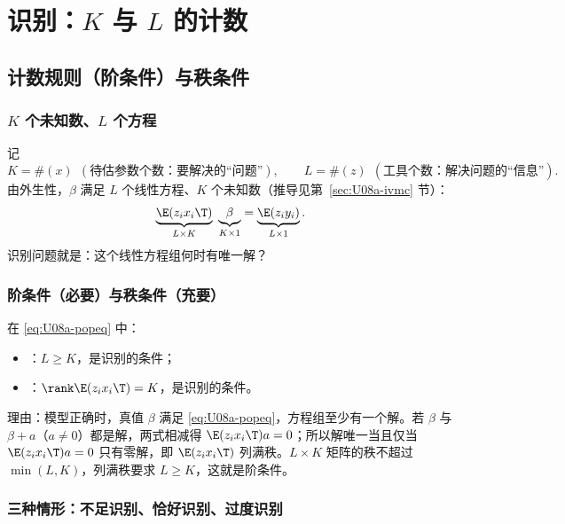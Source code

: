 \section{识别：\texorpdfstring{$K$}{K} 与 \texorpdfstring{$L$}{L} 的计数}\label{sec:U08a-ident}

\subsection{计数规则（阶条件）与秩条件}

\subsubsection{\texorpdfstring{$K$}{K} 个未知数、\texorpdfstring{$L$}{L} 个方程}

记
\[
K=\#(x)\ \ (\text{待估参数个数：要解决的“问题”}),\qquad L=\#(z)\ \ (\text{工具个数：解决问题的“信息”}).
\]
由外生性，$\beta$ 满足 $L$ 个线性方程、$K$ 个未知数（推导见第~\ref{sec:U08a-ivmc} 节）：
\begin{equation}\label{eq:U08a-popeq}
\underbrace{\E(z_ix_i\T)}_{L\times K}\ \underbrace{\beta}_{K\times1}=\underbrace{\E(z_iy_i)}_{L\times1}.
\end{equation}
识别问题就是：这个线性方程组何时有唯一解？

\subsubsection{阶条件（必要）与秩条件（充要）}

\begin{thm}[识别的阶条件与秩条件]\label{thm:U08a-ident}
在 \eqref{eq:U08a-popeq} 中：
\begin{itemize}
  \item {}：$L\ge K$，是识别的条件；
  \item {}：$\rank\E(z_ix_i\T)=K$，是识别的条件。
\end{itemize}
\end{thm}
理由：模型正确时，真值 $\beta$ 满足 \eqref{eq:U08a-popeq}，方程组至少有一个解。若 $\beta$ 与 $\beta+a$（$a\neq0$）都是解，两式相减得 $\E(z_ix_i\T)a=0$；所以解唯一当且仅当 $\E(z_ix_i\T)a=0$ 只有零解，即 $\E(z_ix_i\T)$ 列满秩。$L\times K$ 矩阵的秩不超过 $\min(L,K)$，列满秩要求 $L\ge K$，这就是阶条件。

\subsubsection{三种情形：不足识别、恰好识别、过度识别}

